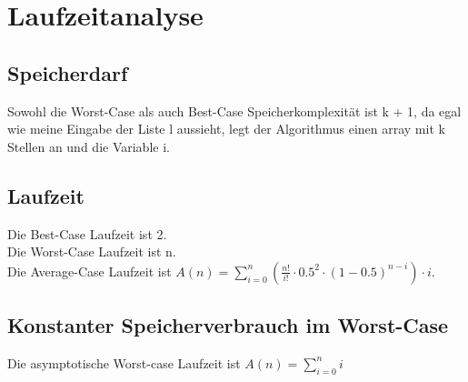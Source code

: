 \section{Laufzeitanalyse}
\subsection{Speicherdarf}
Sowohl die Worst-Case als auch Best-Case Speicherkomplexität ist k + 1, da egal wie meine Eingabe der Liste l aussieht, legt der Algorithmus einen array mit k Stellen an und die Variable i.
\subsection{Laufzeit}
Die Best-Case Laufzeit ist 2.\\
Die Worst-Case Laufzeit ist n.\\
Die Average-Case Laufzeit ist $A(n)=\sum\nolimits_{i=0}^n ( \frac{n!}{i!} \cdot 0.5^2 \cdot (1-0.5)^{n-i} ) \cdot i$.\\
\subsection{Konstanter Speicherverbrauch im Worst-Case}

Die asymptotische Worst-case Laufzeit ist $A(n)=\sum\nolimits_{i=0}^n i$